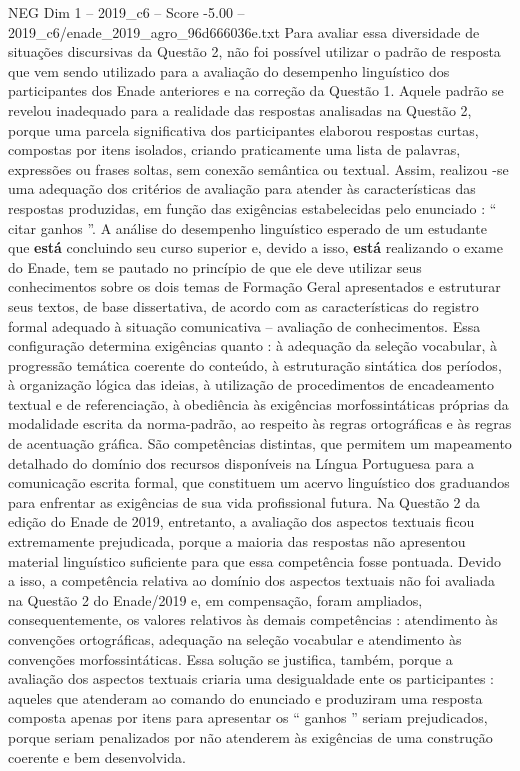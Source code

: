 \begin{textsample}{NEG Dim 1 – 2019\_c6 – Score -5.00 – 2019\_c6/enade\_2019\_agro\_96d666036e.txt}
Para avaliar essa diversidade de situações discursivas da Questão 2, não foi possível utilizar o padrão de resposta que vem sendo utilizado para a avaliação do desempenho linguístico dos participantes dos Enade anteriores e na correção da Questão 1.
Aquele padrão se revelou inadequado para a realidade das respostas analisadas na Questão 2, porque uma parcela significativa dos participantes elaborou respostas curtas, compostas por itens isolados, criando praticamente uma lista de palavras, expressões ou frases soltas, sem conexão semântica ou textual.
Assim, realizou -se uma adequação dos critérios de avaliação para atender às características das respostas produzidas, em função das exigências estabelecidas pelo enunciado : “ citar ganhos ”.
A análise do desempenho linguístico esperado de um estudante que \textbf{está} concluindo seu curso superior e, devido a isso, \textbf{está} realizando o exame do Enade, tem se pautado no princípio de que ele deve utilizar seus conhecimentos sobre os dois temas de Formação Geral apresentados e estruturar seus textos, de base dissertativa, de acordo com as características do registro formal adequado à situação comunicativa – avaliação de conhecimentos.
Essa configuração determina exigências quanto : à adequação da seleção vocabular, à progressão temática coerente do conteúdo, à estruturação sintática dos períodos, à organização lógica das ideias, à utilização de procedimentos de encadeamento textual e de referenciação, à obediência às exigências morfossintáticas próprias da modalidade escrita da norma-padrão, ao respeito às regras ortográficas e às regras de acentuação gráfica.
São competências distintas, que permitem um mapeamento detalhado do domínio dos recursos disponíveis na Língua Portuguesa para a comunicação escrita formal, que constituem um acervo linguístico dos graduandos para enfrentar as exigências de sua vida profissional futura.
Na Questão 2 da edição do Enade de 2019, entretanto, a avaliação dos aspectos textuais ficou extremamente prejudicada, porque a maioria das respostas não apresentou material linguístico suficiente para que essa competência fosse pontuada.
Devido a isso, a competência relativa ao domínio dos aspectos textuais não foi avaliada na Questão 2 do Enade/2019 e, em compensação, foram ampliados, consequentemente, os valores relativos às demais competências : atendimento às convenções ortográficas, adequação na seleção vocabular e atendimento às convenções morfossintáticas.
Essa solução se justifica, também, porque a avaliação dos aspectos textuais criaria uma desigualdade ente os participantes : aqueles que atenderam ao comando do enunciado e produziram uma resposta composta apenas por itens para apresentar os “ ganhos ” seriam prejudicados, porque seriam penalizados por não atenderem às exigências de uma construção coerente e bem desenvolvida.

\end{textsample}
